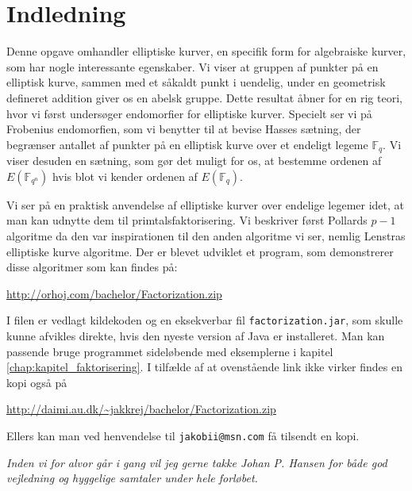 \chapter{Indledning}

Denne opgave omhandler elliptiske kurver, en specifik form for algebraiske kurver, som har nogle interessante egenskaber. Vi viser at gruppen af punkter på en elliptisk kurve, sammen med et såkaldt punkt i uendelig, under en geometrisk defineret addition giver os en abelsk gruppe. Dette resultat åbner for en rig teori, hvor vi først undersøger endomorfier for elliptiske kurver. Specielt ser vi på Frobenius endomorfien, som vi benytter til at bevise Hasses sætning, der begrænser antallet af punkter på en elliptisk kurve over et endeligt legeme $\mathbb{F}_q$. Vi viser desuden en sætning, som gør det muligt for os, at bestemme ordenen af $E(\mathbb{F}_{q^n})$ hvis blot vi kender ordenen af $E(\mathbb{F}_q)$.

Vi ser på en praktisk anvendelse af elliptiske kurver over endelige legemer idet, at man kan udnytte dem til primtalsfaktorisering. Vi beskriver først Pollards $p-1$ algoritme da den var inspirationen til den anden algoritme vi ser, nemlig Lenstras elliptiske kurve algoritme. 
Der er blevet udviklet et program, som demonstrerer disse algoritmer som kan findes på:
\begin{center}
	\url{http://orhoj.com/bachelor/Factorization.zip}
\end{center}
I filen er vedlagt kildekoden og en eksekverbar fil \texttt{factorization.jar}, som skulle kunne afvikles direkte, hvis den nyeste version af Java er installeret. Man kan passende bruge programmet sideløbende med eksemplerne i kapitel \ref{chap:kapitel_faktorisering}. I tilfælde af at ovenstående link ikke virker findes en kopi også på
\begin{center}
	\url{http://daimi.au.dk/~jakkrej/bachelor/Factorization.zip}
\end{center}
Ellers kan man ved henvendelse til \texttt{jakobii@msn.com} få tilsendt en kopi.

\vspace*{\fill}
\textit{Inden vi for alvor går i gang vil jeg gerne takke Johan P. Hansen for både god vejledning og hyggelige samtaler under hele forløbet.}